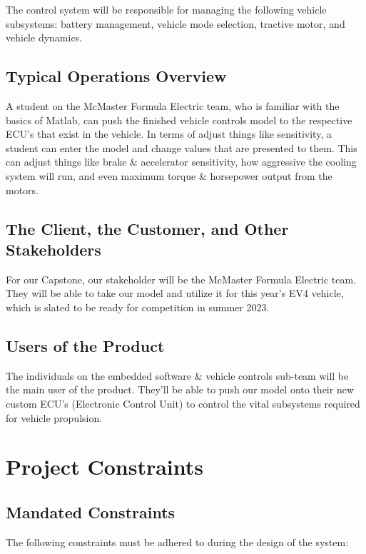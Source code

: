 \documentclass[12pt]{article}
\begin{document}
The control system will be responsible for managing the following vehicle subsystems: battery management, vehicle mode selection, tractive motor, and vehicle dynamics.

\subsection{Typical Operations Overview}

A student on the McMaster Formula Electric team, who is familiar with the basics of Matlab, can push the finished
vehicle controls model to the respective ECU's that exist in the vehicle. In terms of adjust things like sensitivity, a 
student can enter the model and change values that are presented to them. This can adjust things like brake \& accelerator 
sensitivity, how aggressive the cooling system will run, and even maximum torque \& horsepower output from the motors.

\subsection{The Client, the Customer, and Other Stakeholders}

For our Capstone, our stakeholder will be the McMaster Formula Electric team. They will be able to take our model 
and utilize it for this year's EV4 vehicle, which is slated to be ready for competition in summer 2023.

\subsection{Users of the Product}

The individuals on the embedded software \& vehicle controls sub-team will be the main user of the product. 
They'll be able to push our model onto their new custom ECU's (Electronic Control Unit) to control the 
vital subsystems required for vehicle propulsion. 

\section{Project Constraints}

\subsection{Mandated Constraints}

The following constraints must be adhered to during the design of the system:
\end{document}
